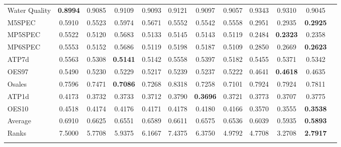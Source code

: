 \documentclass{article}
\begin{document}
\begin{table}[t!]
{\begin{tabular}{l@{\extracolsep{\fill}}ccccccccccc}
Water Quality &\textbf{0.8994} &0.9085 &0.9109 &0.9093 &0.9121 &0.9097 &0.9057 &0.9343 &0.9310 &0.9045   \\
M5SPEC &0.5910 &0.5523 &0.5974 &0.5671 &0.5552 &0.5542 &0.5558 &0.2951 &0.2935 &\textbf{0.2925}   \\
MP5SPEC &0.5522 &0.5120 &0.5683 &0.5133 &0.5145 &0.5143 &0.5119 &0.2484 &\textbf{0.2323} &0.2358   \\
MP6SPEC &0.5553 &0.5152 &0.5686 &0.5119 &0.5198 &0.5187 &0.5109 &0.2850 &0.2669 &\textbf{0.2623}   \\
ATP7d &0.5563 &0.5308 &\textbf{0.5141} &0.5142 &0.5558 &0.5397 &0.5182 &0.5455 &0.5371 &0.5342   \\
OES97 &0.5490 &0.5230 &0.5229 &0.5217 &0.5239 &0.5237 &0.5222 &0.4641 &\textbf{0.4618} &0.4635   \\
Osales &0.7596 &0.7471 &\textbf{0.7086} &0.7268 &0.8318 &0.7258 &0.7101 &0.7924 &0.7924 &0.7811   \\
ATP1d &0.4173 &0.3732 &0.3733 &0.3712 &0.3790 &\textbf{0.3696} &0.3721 &0.3773 &0.3707 &0.3775   \\
OES10 &0.4518 &0.4174 &0.4176 &0.4171 &0.4178 &0.4180 &0.4166 &0.3570 &0.3555 &\textbf{0.3538}   \\
\noalign{\smallskip}\hline\noalign{\smallskip}
Average &0.6910 &0.6625 &0.6551 &0.6589 &0.6611 &0.6575 &0.6536 &0.6039 &0.5935 &\textbf{0.5893}   \\
Ranks &7.5000 &5.7708 &5.9375 &6.1667 &7.4375 &6.3750 &4.9792 &4.7708 &3.2708 &\textbf{2.7917}   \\
\noalign{\smallskip}\hline
\end{tabular}}
\end{table}
\end{document}
